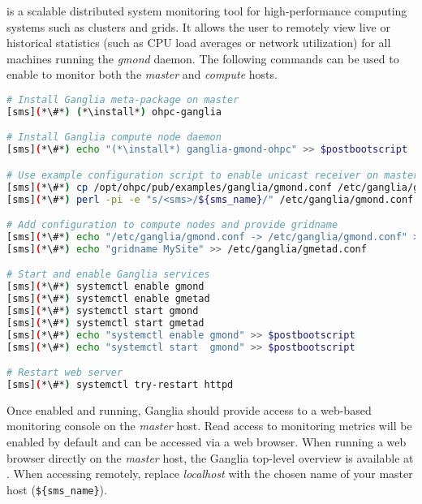 \Ganglia{} is a scalable distributed system monitoring tool for high-performance
computing systems such as clusters and grids. It allows the user to remotely
view live or historical statistics (such as CPU load averages or network
utilization) for all machines running the {\em gmond} daemon. The following 
commands can be used to enable \Ganglia{} to monitor both the {\em master} and 
{\em compute} hosts.

\begin{lstlisting}[language=bash,keywords={},upquote=true]
# Install Ganglia meta-package on master
[sms](*\#*) (*\install*) ohpc-ganglia

# Install Ganglia compute node daemon
[sms](*\#*) echo "(*\install*) ganglia-gmond-ohpc" >> $postbootscript

# Use example configuration script to enable unicast receiver on master host
[sms](*\#*) cp /opt/ohpc/pub/examples/ganglia/gmond.conf /etc/ganglia/gmond.conf
[sms](*\#*) perl -pi -e "s/<sms>/${sms_name}/" /etc/ganglia/gmond.conf

# Add configuration to compute nodes and provide gridname 
[sms](*\#*) echo "/etc/ganglia/gmond.conf -> /etc/ganglia/gmond.conf" >>$synclist
[sms](*\#*) echo "gridname MySite" >> /etc/ganglia/gmetad.conf

# Start and enable Ganglia services
[sms](*\#*) systemctl enable gmond
[sms](*\#*) systemctl enable gmetad
[sms](*\#*) systemctl start gmond
[sms](*\#*) systemctl start gmetad
[sms](*\#*) echo "systemctl enable gmond" >> $postbootscript
[sms](*\#*) echo "systemctl start  gmond" >> $postbootscript

# Restart web server
[sms](*\#*) systemctl try-restart httpd
\end{lstlisting}

\noindent Once enabled and running, Ganglia should provide access to a web-based
monitoring console on the {\em master} host. Read access to monitoring metrics
will be enabled by default and can be accessed via a web browser. When running
a web browser directly on the {\em master} host, the Ganglia top-level overview
is available
at \href{http://localhost/ganglia}{\color{blue}{http://localhost/ganglia}}.
When accessing remotely, replace {\em localhost} with the chosen name of your
master host (\texttt{\$\{sms\_name\}}).


